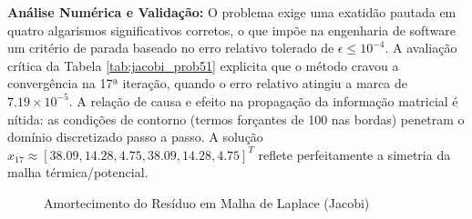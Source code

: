 \begin{table}[H]
\centering
\caption{Histórico de Convergência Iterativa (Problema 5.1 - Gauss-Jacobi)}
\label{tab:jacobi_prob51}
\end{table}

\textbf{Análise Numérica e Validação:} O problema exige uma exatidão pautada em quatro algarismos significativos corretos, o que impõe na engenharia de software um critério de parada baseado no erro relativo tolerado de $\epsilon \leq 10^{-4}$. A avaliação crítica da Tabela \ref{tab:jacobi_prob51} explicita que o método cravou a convergência na 17ª iteração, quando o erro relativo atingiu a marca de $7.19 \times 10^{-5}$. A relação de causa e efeito na propagação da informação matricial é nítida: as condições de contorno (termos forçantes de 100 nas bordas) penetram o domínio discretizado passo a passo. A solução $x_{17} \approx[38.09, 14.28, 4.75, 38.09, 14.28, 4.75]^T$ reflete perfeitamente a simetria da malha térmica/potencial.

\begin{figure}[H]
\centering
{}
\caption{Amortecimento do Resíduo em Malha de Laplace (Jacobi)}
\label{fig:jacobi_prob51}
\end{figure}

